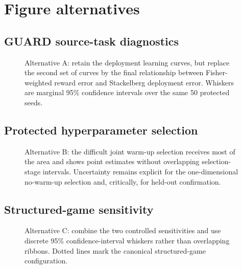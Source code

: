 \documentclass{article}
\begin{document}
\section{Figure alternatives}

\subsection{GUARD source-task diagnostics}
\begin{figure}[H]
  \centering
  \resizebox{\textwidth}{!}{}
  \caption{Alternative A: retain the deployment learning curves, but replace
  the second set of curves by the final relationship between Fisher-weighted
  reward error and Stackelberg deployment error. Whiskers are marginal 95\%
  confidence intervals over the same 50 protected seeds.}
\end{figure}

\clearpage
\subsection{Protected hyperparameter selection}
\begin{figure}[H]
  \centering
  \resizebox{\textwidth}{!}{}
  \caption{Alternative B: the difficult joint warm-up selection receives most
  of the area and shows point estimates without overlapping selection-stage
  intervals. Uncertainty remains explicit for the one-dimensional no-warm-up
  selection and, critically, for held-out confirmation.}
\end{figure}

\clearpage
\subsection{Structured-game sensitivity}
\begin{figure}[H]
  \centering
  \resizebox{\textwidth}{!}{}
  \caption{Alternative C: combine the two controlled sensitivities and use
  discrete 95\% confidence-interval whiskers rather than overlapping ribbons.
  Dotted lines mark the canonical structured-game configuration.}
\end{figure}
\end{document}
